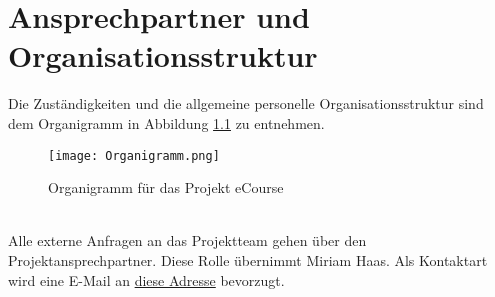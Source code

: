 
\chapter{Ansprechpartner und Organisationsstruktur}
Die Zuständigkeiten und die allgemeine personelle Organisationsstruktur sind dem Organigramm in Abbildung \ref{fib:Organigramm} zu entnehmen.
\begin{figure}[h]
\centering
\texttt{[image: Organigramm.png]}
\caption{Organigramm für das Projekt eCourse}
\label{fib:Organigramm}
\end{figure}\\

Alle externe Anfragen an das Projektteam gehen über den Projektansprechpartner. Diese Rolle übernimmt Miriam Haas. Als Kontaktart wird eine E-Mail an \href{mailto:inf19109@lehre.dhbw-stuttgart.de}{diese Adresse} bevorzugt. 